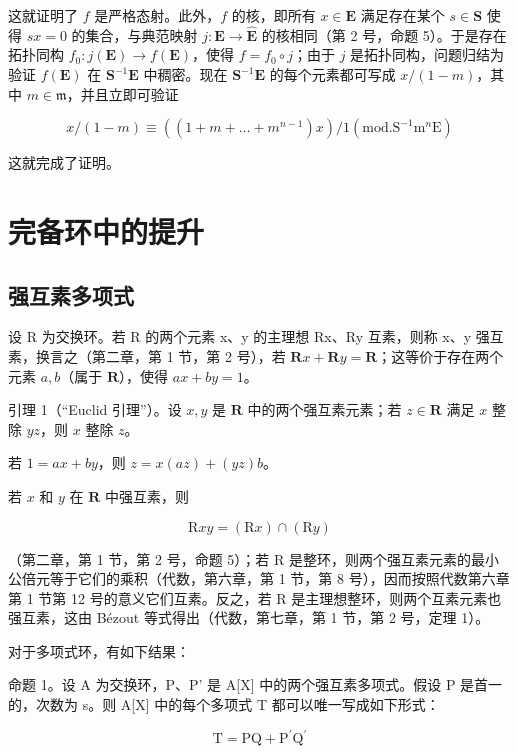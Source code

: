 这就证明了 \(f\) 是严格态射。此外，\(f\) 的核，即所有 \(x \in \mathbf{E}\) 满足存在某个 \(s \in \mathbf{S}\) 使得 \(sx = 0\) 的集合，与典范映射 \(j: \mathbf{E} \to \hat{\mathbf{E}}\) 的核相同（第 2 号，命题 5）。于是存在拓扑同构 \(f_0: j(\mathbf{E}) \to f(\mathbf{E})\)，使得 \(f = f_0 \circ j\)；由于 \(j\) 是拓扑同构，问题归结为验证 \(f(\mathbf{E})\) 在 \(\mathbf{S}^{-1}\mathbf{E}\) 中稠密。现在 \(\mathbf{S}^{-1}\mathbf{E}\) 的每个元素都可写成 \(x / (1 - m)\)，其中 \(m \in \mathfrak{m}\)，并且立即可验证

\[
x / (1 - m) \equiv ((1 + m + \dots + m ^ {n - 1}) x) / 1 (\mathrm{mod.} \mathrm{S} ^ {- 1} \mathrm{m} ^ {n} \mathrm{E})
\]

这就完成了证明。

\section{完备环中的提升}

\subsection{强互素多项式}

设 R 为交换环。若 R 的两个元素 x、y 的主理想 Rx、Ry 互素，则称 x、y 强互素，换言之（第二章，第 1 节，第 2 号），若 \(\mathbf{R}x + \mathbf{R}y = \mathbf{R}\)；这等价于存在两个元素 \(a, b\)（属于 \(\mathbf{R}\)），使得 \(ax + by = 1\)。

引理 1（“Euclid 引理”）。设 \(x, y\) 是 \(\mathbf{R}\) 中的两个强互素元素；若 \(z \in \mathbf{R}\) 满足 \(x\) 整除 \(yz\)，则 \(x\) 整除 \(z\)。

若 \(1 = ax + by\)，则 \(z = x(az) + (yz)b\)。

若 \(x\) 和 \(y\) 在 \(\mathbf{R}\) 中强互素，则

\[
\mathrm{R} x y = (\mathrm{R} x) \cap (\mathrm{R} y)
\]

（第二章，第 1 节，第 2 号，命题 5）；若 R 是整环，则两个强互素元素的最小公倍元等于它们的乘积（代数，第六章，第 1 节，第 8 号），因而按照代数第六章第 1 节第 12 号的意义它们互素。反之，若 R 是主理想整环，则两个互素元素也强互素，这由 Bézout 等式得出（代数，第七章，第 1 节，第 2 号，定理 1）。

对于多项式环，有如下结果：

命题 1。设 A 为交换环，P、P' 是 A{[}X{]} 中的两个强互素多项式。假设 P 是首一的，次数为 s。则 A{[}X{]} 中的每个多项式 T 都可以唯一写成如下形式：

\[
\mathrm{T} = \mathrm{PQ} + \mathrm{P} ^ {\prime} \mathrm{Q} ^ {\prime}\tag{1}
\]

